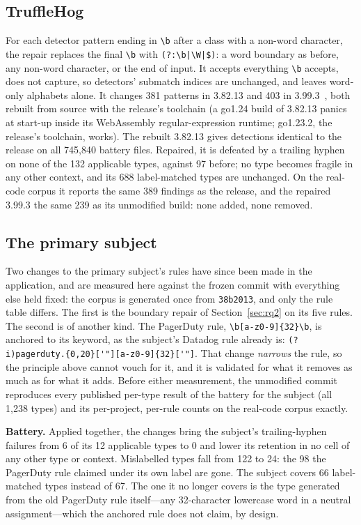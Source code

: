 \documentclass[10pt,journal,compsoc]{IEEEtran}
\begin{document}
\subsection{TruffleHog}

For each detector pattern ending in \verb|\b| after a class with a non-word character, the repair replaces the final \verb|\b| with \verb+(?:\b|\W|$)+: a word boundary as before, any non-word character, or the end of input. It accepts everything \verb|\b| accepts, does not capture, so detectors' submatch indices are unchanged, and leaves word-only alphabets alone. It changes 381 patterns in 3.82.13 and 403 in 3.99.3~\cite{trufflehog399}, both rebuilt from source with the release's toolchain (a go1.24 build of 3.82.13 panics at start-up inside its WebAssembly regular-expression runtime; go1.23.2, the release's toolchain, works). The rebuilt 3.82.13 gives detections identical to the release on all 745{,}840 battery files. Repaired, it is defeated by a trailing hyphen on none of the 132 applicable types, against 97 before; no type becomes fragile in any other context, and its 688 label-matched types are unchanged. On the real-code corpus it reports the same 389 findings as the release, and the repaired 3.99.3 the same 239 as its unmodified build: none added, none removed.

\subsection{The primary subject}
\label{sec:rq5-ap}

Two changes to the primary subject's rules have since been made in the application, and are measured here against the frozen commit with everything else held fixed: the corpus is generated once from \texttt{38b2013}, and only the rule table differs. The first is the boundary repair of Section~\ref{sec:rq2} on its five rules. The second is of another kind. The PagerDuty rule, \verb|\b[a-z0-9]{32}\b|, is anchored to its keyword, as the subject's Datadog rule already is: \verb|(?i)pagerduty.{0,20}['"][a-z0-9]{32}['"]|. That change \emph{narrows} the rule, so the principle above cannot vouch for it, and it is validated for what it removes as much as for what it adds. Before either measurement, the unmodified commit reproduces every published per-type result of the battery for the subject (all 1{,}238 types) and its per-project, per-rule counts on the real-code corpus exactly.

\textbf{Battery.} Applied together, the changes bring the subject's trailing-hyphen failures from 6 of its 12 applicable types to 0 and lower its retention in no cell of any other type or context. Mislabelled types fall from 122 to 24: the 98 the PagerDuty rule claimed under its own label are gone. The subject covers 66 label-matched types instead of 67. The one it no longer covers is the type generated from the old PagerDuty rule itself---any 32-character lowercase word in a neutral assignment---which the anchored rule does not claim, by design.
\end{document}
